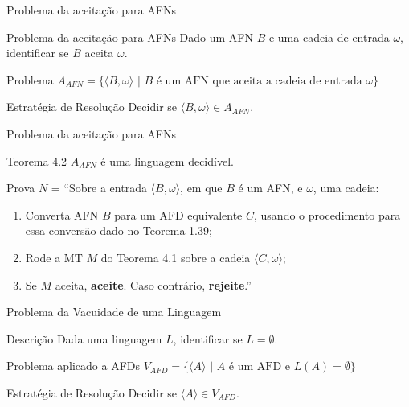 \documentclass[xcolor=dvipsnames,table]{beamer}
\begin{document}
	\begin{frame}{Problema da aceitação para AFNs}
		\begin{block}{Problema da aceitação para AFNs}
			Dado um AFN $B$ e uma cadeia de entrada $\omega$, identificar se $B$ aceita $\omega$.
		\end{block}	\pause
		\begin{block}{Problema}
			$A_{AFN} = \{ \langle B, \omega \rangle \mbox{ | } B \mbox{ é um AFN que aceita a cadeia de entrada } \omega \}$
		\end{block} \pause
		\begin{block}{Estratégia de Resolução}
			Decidir se $\langle B, \omega \rangle \in A_{AFN}$.
		\end{block}
	\end{frame}	
	
	\begin{frame}{Problema da aceitação para AFNs}
		\begin{block}{Teorema 4.2}
			$A_{AFN}$ é uma linguagem decidível.
		\end{block} \pause
		\begin{block}{Prova}
			$N$ = ``Sobre a entrada $\langle B, \omega \rangle$, em que $B$ é um AFN, e $\omega$, uma cadeia:
			\begin{enumerate}
				\item Converta AFN $B$ para um AFD equivalente $C$, usando o procedimento para essa conversão dado no Teorema 1.39;
				\item Rode a MT $M$ do Teorema 4.1 sobre a cadeia $\langle C, \omega \rangle$;
				\item Se $M$ aceita, {\bf aceite}. Caso contrário, {\bf rejeite}.''
			\end{enumerate}
		\end{block}
	\end{frame}
	
	\begin{frame}{Problema da Vacuidade de uma Linguagem}
		\begin{block}{Descrição}
			Dada uma linguagem $L$, identificar se $L = \emptyset$.
		\end{block}	
		\begin{block}{Problema aplicado a AFDs}
			$V_{AFD} = \{ \langle A \rangle \mbox{ | } A \mbox{ é um AFD e } L(A) = \emptyset \}$
		\end{block} 
		\begin{block}{Estratégia de Resolução}
			Decidir se $\langle A \rangle \in V_{AFD}$.
		\end{block}
	\end{frame}	
	
\end{document}
